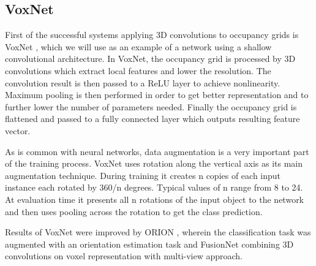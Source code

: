 \subsection{VoxNet}
First of the successful systems applying 3D convolutions to occupancy grids is VoxNet \cite{maturana_voxnet:_2015}, which we will use as an example of a network using a shallow convolutional architecture. 
In VoxNet, the occupancy grid is processed by 3D convolutions which extract local features and lower the resolution. The convolution result is then passed to a ReLU layer to achieve nonlinearity. Maximum pooling is then performed in order to get better representation and to further lower the number of parameters needed. Finally the occupancy grid is flattened and passed to a fully connected layer which outputs resulting feature vector. \par  
As is common with neural networks, data augmentation is a very important part of the training process. VoxNet uses rotation along the vertical axis as its main augmentation technique. During training it creates n copies of each input instance each rotated by 360/n degrees. Typical values of n range from 8 to 24. At evaluation time it presents all n rotations of the input object to the network and then uses pooling across the rotation to get the class prediction. \par
Results of VoxNet were improved by ORION \cite{sedaghat_orientation-boosted_2016}, wherein the classification task was augmented
with an orientation estimation task and FusionNet \cite{hegde_fusionnet:_2016} combining 3D convolutions on voxel representation with multi-view approach.

